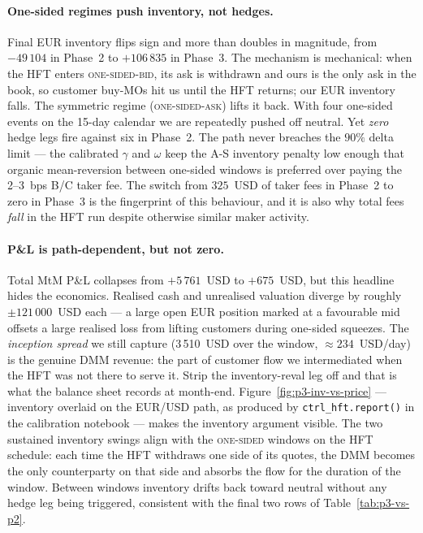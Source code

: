 \paragraph{One-sided regimes push inventory, not hedges.} Final EUR
inventory flips sign and more than doubles in magnitude, from
$-49\,104$ in Phase~2 to $+106\,835$ in Phase~3. The mechanism is
mechanical: when the HFT enters \textsc{one-sided-bid}, its ask is
withdrawn and ours is the only ask in the book, so customer
buy-MOs hit us until the HFT returns; our EUR inventory falls. The
symmetric regime (\textsc{one-sided-ask}) lifts it back. With four
one-sided events on the 15-day calendar we are repeatedly pushed
off neutral. Yet \emph{zero} hedge legs fire against six in
Phase~2. The path never breaches the $90\%$ delta limit --- the
calibrated $\gamma$ and $\omega$ keep the A-S inventory penalty
low enough that organic mean-reversion between one-sided windows
is preferred over paying the 2--3~bps B/C taker fee. The switch
from $325$~USD of taker fees in Phase~2 to zero in Phase~3 is the
fingerprint of this behaviour, and it is also why total fees
\emph{fall} in the HFT run despite otherwise similar maker
activity.

\paragraph{P\&L is path-dependent, but not zero.} Total MtM P\&L
collapses from $+5\,761$~USD to $+675$~USD, but this headline hides
the economics. Realised cash and unrealised valuation diverge by
roughly $\pm 121\,000$~USD each --- a large open EUR position
marked at a favourable mid offsets a large realised loss from
lifting customers during one-sided squeezes. The \emph{inception
spread} we still capture (3\,510~USD over the window,
$\approx 234$~USD/day) is the genuine DMM revenue: the part of
customer flow we intermediated when the HFT was not there to
serve it. Strip the inventory-reval leg off and that is what the
balance sheet records at month-end.
Figure~\ref{fig:p3-inv-vs-price} --- inventory overlaid on the
EUR/USD path, as produced by \texttt{ctrl\_hft.report()} in the
calibration notebook --- makes the inventory argument visible.
The two sustained inventory swings align with the
\textsc{one-sided} windows on the HFT schedule: each time the HFT
withdraws one side of its quotes, the DMM becomes the only
counterparty on that side and absorbs the flow for the duration
of the window. Between windows inventory drifts back toward
neutral without any hedge leg being triggered, consistent with
the final two rows of Table~\ref{tab:p3-vs-p2}.

